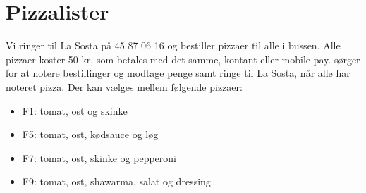 \section{Pizzalister}
Vi ringer til La Sosta på 45 87 06 16 og bestiller pizzaer til alle i bussen. Alle pizzaer koster 50 kr, som betales med det samme, kontant eller mobile pay. \Stive sørger for at notere bestillinger og modtage penge samt ringe til La Sosta, når alle har noteret pizza. Der kan vælges mellem følgende pizzaer:
\begin{itemize}
\item F1: tomat, ost og skinke
\item F5: tomat, ost, kødsauce og løg
\item F7: tomat, ost, skinke og pepperoni
\item F9: tomat, ost, shawarma, salat og dressing
\end{itemize}

